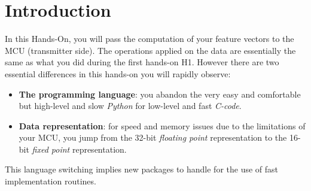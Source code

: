 \section*{Introduction}
%
In this Hands-On, you will pass the computation of your feature vectors to the MCU (transmitter side).
The operations applied on the data are essentially the same as what you did during the first hands-on H1.
However there are two essential differences in this hands-on you will rapidly observe:
\begin{itemize}
    \item \textbf{The programming language}: you abandon the very easy and comfortable but high-level and slow \emph{Python} for low-level and fast \emph{C-code}.
    \item \textbf{Data representation}: for speed and memory issues due to the limitations of your MCU, you jump from the 32-bit \emph{floating point} representation to the 16-bit \emph{fixed point} representation.
\end{itemize}
%
This language switching implies new packages to handle for the use of fast implementation routines.
%
%
%

